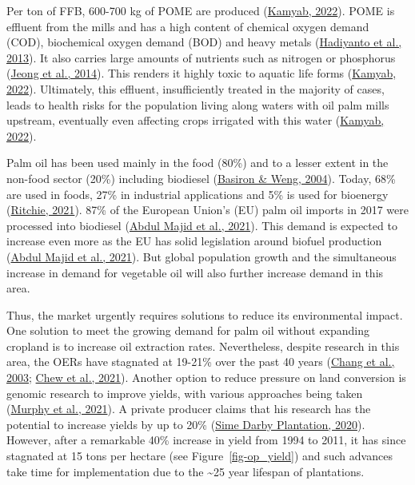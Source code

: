 \documentclass[
  letterpaper,
  DIV=11,
  numbers=noendperiod]{scrreprt}
\begin{document}
Per ton of FFB, 600-700 kg of POME are produced
(\protect\hyperlink{ref-kamyabElaeisGuineensis2022}{Kamyab, 2022}). POME
is effluent from the mills and has a high content of chemical oxygen
demand (COD), biochemical oxygen demand (BOD) and heavy metals
(\protect\hyperlink{ref-hadiyantoPhytoremediationsPalmOil2013}{Hadiyanto
et al., 2013}). It also carries large amounts of nutrients such as
nitrogen or phosphorus
(\protect\hyperlink{ref-jeongPerformanceComparisonMesophilic2014}{Jeong
et al., 2014}). This renders it highly toxic to aquatic life forms
(\protect\hyperlink{ref-kamyabElaeisGuineensis2022}{Kamyab, 2022}).
Ultimately, this effluent, insufficiently treated in the majority of
cases, leads to health risks for the population living along waters with
oil palm mills upstream, eventually even affecting crops irrigated with
this water (\protect\hyperlink{ref-kamyabElaeisGuineensis2022}{Kamyab,
2022}).

Palm oil has been used mainly in the food (80\%) and to a lesser extent
in the non-food sector (20\%) including biodiesel
(\protect\hyperlink{ref-basironOILPALMITS2004}{Basiron \& Weng, 2004}).
Today, 68\% are used in foods, 27\% in industrial applications and 5\%
is used for bioenergy
(\protect\hyperlink{ref-ritchiePalmOil2021}{Ritchie, 2021}). 87\% of the
European Union's (EU) palm oil imports in 2017 were processed into
biodiesel
(\protect\hyperlink{ref-abdulmajidSustainablePalmOil2021}{Abdul Majid et
al., 2021}). This demand is expected to increase even more as the EU has
solid legislation around biofuel production
(\protect\hyperlink{ref-abdulmajidSustainablePalmOil2021}{Abdul Majid et
al., 2021}). But global population growth and the simultaneous increase
in demand for vegetable oil will also further increase demand in this
area.

Thus, the market urgently requires solutions to reduce its environmental
impact. One solution to meet the growing demand for palm oil without
expanding cropland is to increase oil extraction rates. Nevertheless,
despite research in this area, the OERs have stagnated at 19-21\% over
the past 40 years
(\protect\hyperlink{ref-changEconomicPerspectiveOil2003}{Chang et al.,
2003}; \protect\hyperlink{ref-chewImprovingSustainabilityPalm2021}{Chew
et al., 2021}). Another option to reduce pressure on land conversion is
genomic research to improve yields, with various approaches being taken
(\protect\hyperlink{ref-murphyOilPalm2020s2021}{Murphy et al., 2021}). A
private producer claims that his research has the potential to increase
yields by up to 20\%
(\protect\hyperlink{ref-simedarbyplantationSimeDarbyPlantation2020}{Sime
Darby Plantation, 2020}). However, after a remarkable 40\% increase in
yield from 1994 to 2011, it has since stagnated at 15 tons per hectare
(see Figure~\ref{fig-op_yield}) and such advances take time for
implementation due to the \textasciitilde25 year lifespan of
plantations.
\end{document}
